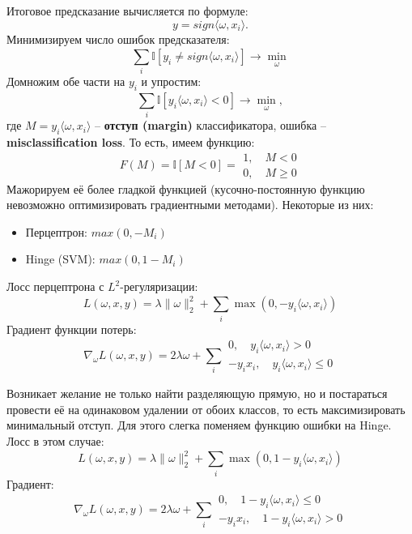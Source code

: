 \documentclass[a4paper, 10pt, openany]{book} %
\begin{document}
	Итоговое предсказание вычисляется по формуле:
	\begin{equation*}
		y = sign\langle \omega,x_i \rangle.
	\end{equation*}
	Минимизируем число ошибок предсказателя:
	\begin{equation*}
		\sum_{i}^{} \mathbb{I}[y_i \not= sign\langle \omega,x_i \rangle] \rightarrow \min_\omega
	\end{equation*}
	Домножим обе части на $y_i$ и упростим:
	\begin{equation*}
		\sum_{i}^{} \mathbb{I}[y_i\langle \omega,x_i \rangle < 0] \rightarrow \min_\omega,
	\end{equation*}
	где $M = y_i\langle \omega,x_i \rangle$ -- \textbf{отступ (margin)} классификатора, ошибка -- \textbf{misclassification loss}.
	То есть, имеем функцию:
	\begin{equation*}
		F(M) = \mathbb{I}[M < 0] = 
		\begin{gathered}
			1,\quad M < 0 \\
			0,\quad M \geq 0
		\end{gathered}
	\end{equation*}
	Мажорируем её более гладкой функцией (кусочно-постоянную функцию невозможно оптимизировать градиентными методами). Некоторые из них:
	\begin{itemize}
		\item Перцептрон: $max(0, -M_i)$
		\item Hinge (SVM): $max(0, 1-M_i)$
	\end{itemize}
	
	Лосс перцептрона с $L^2$-регуляризации:
	\begin{equation*}
		L(\omega, x, y) = \lambda \|\omega\|^2_2 + \sum_{i}^{} \max(0,-y_i\langle \omega, x_i \rangle)
	\end{equation*}
	Градиент функции потерь:
	\begin{equation*}
		\nabla_\omega L(\omega, x, y) = 2 \lambda \omega + \sum_{i}^{}
		\begin{gathered}
			0,\quad y_i\langle \omega, x_i \rangle > 0 \\
			- y_i x_i,\quad y_i\langle \omega, x_i \rangle \leq 0
		\end{gathered}
	\end{equation*}
	
	Возникает желание не только найти разделяющую прямую, но и постараться провести её на одинаковом удалении от обоих классов, то есть максимизировать минимальный отступ. Для этого слегка поменяем функцию ошибки на Hinge. Лосс в этом случае:
	\begin{equation*}
		L(\omega, x, y) = \lambda \|\omega\|^2_2 + \sum_{i}^{} \max(0, 1 - y_i\langle \omega, x_i \rangle)
	\end{equation*}
	Градиент:
	\begin{equation*}
		\nabla_\omega L(\omega, x, y) = 2 \lambda \omega + \sum_{i}^{}
		\begin{gathered}
			0,\quad 1 - y_i\langle \omega, x_i \rangle \leq 0 \\
			- y_i x_i,\quad 1 - y_i\langle \omega, x_i \rangle > 0
		\end{gathered}
	\end{equation*}
\end{document}

